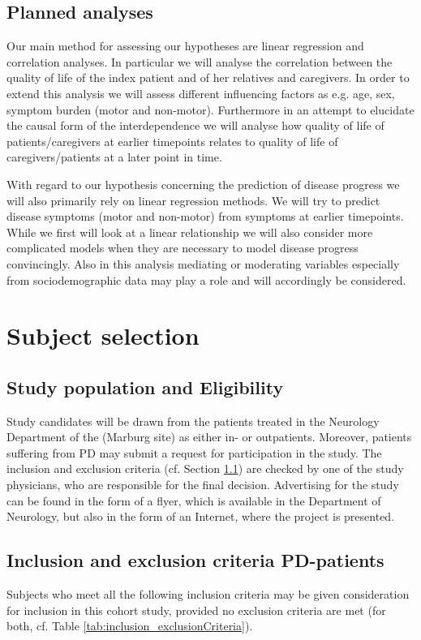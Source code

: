\subsection{Planned analyses}
Our main method for assessing our hypotheses are linear regression and correlation analyses. In particular we will analyse the correlation between the quality of life of the index patient and of her relatives and caregivers. In order to extend this analysis we will assess different influencing factors as e.g. age, sex, symptom burden (motor and non-motor). Furthermore in an attempt to elucidate the causal form of the interdependence we will analyse how quality of life of patients/caregivers at earlier timepoints relates to quality of life of caregivers/patients at a later point in time.

With regard to our hypothesis concerning the prediction of disease progress we will also primarily rely on linear regression methods. We will try to predict disease symptoms (motor and non-motor) from symptoms at earlier timepoints. While we first will look at a linear relationship we will also consider more complicated models when they are necessary to model disease progress convincingly. Also in this analysis mediating or moderating variables especially from sociodemographic data may play a role and will accordingly be considered.


\section{Subject selection}
\label{sec:study_selection}
\subsection{Study population and Eligibility}
\label{sec:study_population}
Study candidates will be drawn from the patients treated in the Neurology Department of the \UKGM (Marburg site) as either in- or outpatients. Moreover, patients suffering from \ac{PD} may submit a request for participation in the study. The inclusion and exclusion criteria (cf. Section \ref{sec:study_population}) are checked by one of the study physicians, who are responsible for the final decision. Advertising for the study can be found in the form of a flyer, which is available in the Department of Neurology, but also in the form of an Internet, where the project is presented.

\subsection{Inclusion and exclusion criteria \ac{PD}-patients}
\label{sec:inclusion_criteriaIPS}
Subjects who meet all the following inclusion criteria may be given consideration for inclusion in this cohort study, provided no exclusion criteria are met (for both, cf. Table \ref{tab:inclusion_exclusionCriteria}).

